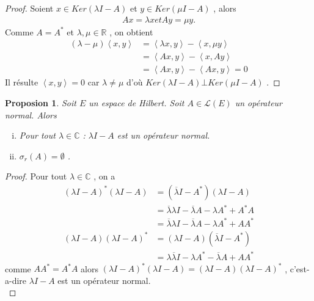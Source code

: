 \documentclass{report}
\newtheorem{Prop}{Proposion}[subsection]
\begin{document}
{\begin{proof}
 Soient $x \in Ker(\lambda I - A)$ et $y \in Ker(\mu I - A)$ , alors 
					\begin{align*}
					 A x = \lambda x et A y = \mu y .
					\end{align*}
	Comme $A = A^*$ et $\lambda, \mu \in \mathbb{R}$ , on obtient 
					\begin{align*}
					 (\lambda - \mu) \left< x,y \right> &= \left< \lambda x,y \right> - \left< x,\mu y \right> \\
					 &= \left< Ax,y \right> - \left< x,Ay \right> \\
					 &= \left< Ax,y \right> - \left< Ax,y \right> = 0 
					\end{align*}
	Il résulte $\left< x,y \right> = 0$ car $\lambda \neq \mu$ d'où $Ker(\lambda I - A) \bot Ker(\mu I - A)$ .
\end{proof}


\begin{Prop} Soit $E$ un espace de Hilbert. Soit $A \in \mathscr{L}(E)$ un opérateur normal. Alors \\
	


	\begin{enumerate}[i)]
	\item  Pour tout $\lambda \in \mathbb{C}$ : $\lambda I - A$ est un opérateur normal.\\
	\item $\sigma_r(A) = \emptyset$ .\\
	\end{enumerate}
\end{Prop}
\begin{proof}
 Pour tout $\lambda \in \mathbb{C}$ , on a 
					\begin{align*}
					 (\lambda I - A)^{*} (\lambda I - A) &= (\overline{\lambda} I - A^{*}) (\lambda I - A) \\
					 &=  \overline{\lambda} \lambda I - \overline{\lambda} A - \lambda A^{*} + A^{*} A \\
					 &= \overline{\lambda} \lambda I - \overline{\lambda} A - \lambda A^{*} + A A^{*} \\
					 (\lambda I - A) (\lambda I - A)^{*} &= (\lambda I - A) (\overline{\lambda} I - A^{*}) \\
					 &= \lambda \overline{\lambda} I - \lambda A^{*} - \overline{\lambda} A + A  A^{*} 
					\end{align*}
comme $A A^* = A^* A$ alors $(\lambda I - A)^{*} (\lambda I - A) = (\lambda I - A) (\lambda I - A)^*$ , c'est-a-dire $\lambda I - A$ est un opérateur normal.\\


\end{proof}}
\end{document}
